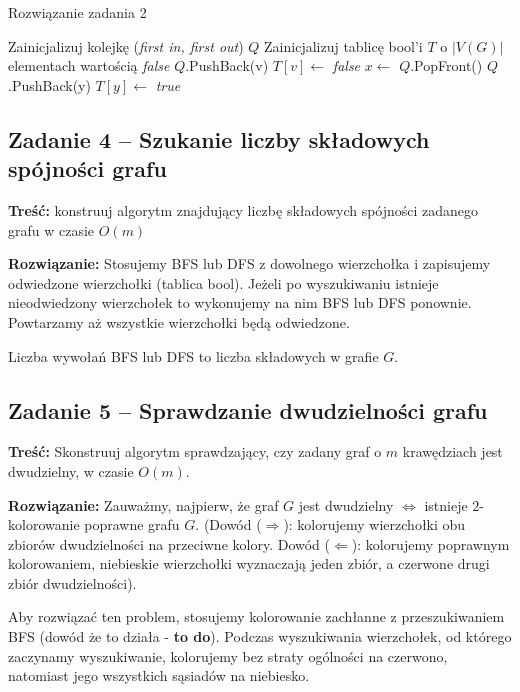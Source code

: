 \begin{algorithm}[H]
	\caption{Rozwiązanie zadania 2}\label{Zadanie23}
	\begin{algorithmic}[1]
		\State Zainicjalizuj kolejkę (\textit{first in, first out}) $Q$
		\State Zainicjalizuj tablicę bool'i $T$ o $|V(G)|$ elementach wartością 
		\textit{false}
		\State $Q$.PushBack(v)
		\State $T[v] \gets$ \textit{false}
		\State $x \gets$ $Q$.PopFront()
		\State $Q$.PushBack(y)
		\State $T[y] \gets$ \textit{true} 
		\EndIf
		\EndWhile
		\EndWhile
		\EndProcedure
	\end{algorithmic}
\end{algorithm}

\subsection{Zadanie 4 -- Szukanie liczby składowych spójności grafu}
\textbf{Treść: } konstruuj algorytm znajdujący liczbę składowych 
spójności zadanego grafu w czasie $O(m)$

\textbf{Rozwiązanie: } Stosujemy BFS lub DFS z dowolnego 
wierzchołka i zapisujemy odwiedzone wierzchołki (tablica bool).
Jeżeli po wyszukiwaniu istnieje nieodwiedzony wierzchołek to 
wykonujemy na nim BFS lub DFS ponownie. Powtarzamy aż
wszystkie wierzchołki będą odwiedzone. 

Liczba wywołań BFS lub DFS to liczba składowych w grafie $G$.

\subsection{Zadanie 5 -- Sprawdzanie dwudzielności grafu}
\textbf{Treść: } Skonstruuj algorytm sprawdzający, 
czy zadany graf o $m$ krawędziach jest dwudzielny, w czasie $O(m)$.

\textbf{Rozwiązanie: } Zauważmy, najpierw, że 
graf $G$ jest dwudzielny $\Leftrightarrow$ istnieje $2$-kolorowanie
poprawne grafu $G$. (Dowód ($\Rightarrow$): kolorujemy 
wierzchołki obu zbiorów dwudzielności na przeciwne kolory. Dowód 
($\Leftarrow$): kolorujemy poprawnym kolorowaniem, niebieskie
wierzchołki wyznaczają jeden zbiór, a czerwone drugi zbiór dwudzielności). 

Aby rozwiązać ten problem, stosujemy kolorowanie 
zachłanne z przeszukiwaniem BFS (dowód że to działa -\textbf{ to do}). 
Podczas wyszukiwania wierzchołek, od którego zaczynamy 
wyszukiwanie, kolorujemy 
bez straty ogólności na czerwono, natomiast jego
wszystkich sąsiadów na niebiesko.

